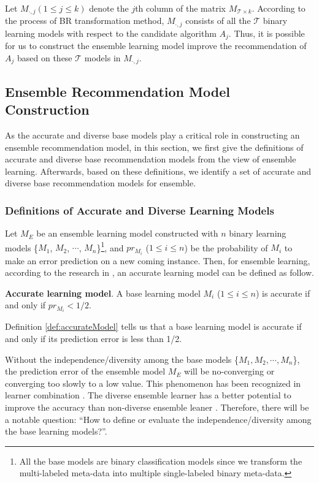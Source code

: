 \documentclass[acmsmall]{acmart}
\begin{document}
Let $M_{\cdot,j} (1\leq j \leq k)$ denote the $j$th column of the
matrix $M_{\mathcal{T}\times k}$. According to the process of BR
transformation method, $M_{\cdot,j}$ consists of all the $\mathcal{T}$ binary
learning models with respect to the candidate algorithm $A_j$. Thus,
it is possible for us to construct the ensemble learning model
improve the recommendation of $A_j$ based on these $\mathcal{T}$ models in
$M_{\cdot,j}$.

\subsection{Ensemble Recommendation Model Construction}\label{subsec:ensembleModelConstruction}

As the accurate and diverse base models play a critical role in
constructing an ensemble recommendation model, in this section, we
first give the definitions of accurate and diverse base
recommendation models from the view of ensemble learning.
Afterwards, based on these definitions, we identify a set of
accurate and diverse base recommendation models for ensemble.

\subsubsection{Definitions of Accurate and Diverse Learning Models}\label{subsubsec:accurateAndDiverseModel}

Let $M_{E}$ be an ensemble learning model constructed with $n$
binary learning models \{$M_1$, $M_2$, $\cdots$,
$M_n$\}\footnote{All the base models are binary classification
	models since we transform the multi-labeled meta-data into multiple
	single-labeled binary meta-data.}, and $pr_{M_i}$ ($1\leq i\leq n$)
be the probability of $M_{i}$ to make an error prediction on a new
coming instance. Then, for ensemble learning, according to the research in \cite{dietterich2000ensemble}, an accurate learning model can be defined as follow.

\begin{definition}\textbf{Accurate learning model}\label{def:accurateModel}.
	A base learning model $M_i$ ($1\leq i\leq n$) is accurate if and
	only if $pr_{M_i} < 1/2$.
\end{definition}

Definition \ref{def:accurateModel} tells us that a base learning
model is accurate if and only if its prediction error is less than
1/2.

Without the independence/diversity among the base models \{$M_1,
M_2, \cdots, M_n$\}, the prediction error of the ensemble model $M_{E}$
will be no-converging or converging too slowly to a low value. This
phenomenon has been recognized in learner combination
\cite{cunningham2000diversity,lam2000classifier}. The diverse
ensemble learner has a better potential to improve the accuracy than
non-diverse ensemble leaner
\cite{peterson2005estimating,brown2005diversity,kuncheva2003measures}.
Therefore, there will be a notable question: ``How to define or
evaluate the independence/diversity among the base learning
models?''.
\end{document}

